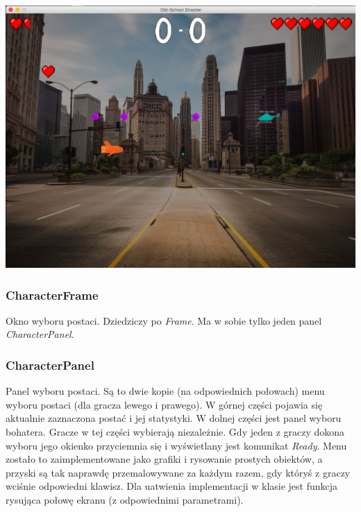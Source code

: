 \documentclass[a4paper,10pt]{article}
\begin{document}
\begin{center}
\includegraphics[scale=0.18]{pojedynek.png}
\end{center}

\subsubsection{CharacterFrame}

Okno wyboru postaci. Dziedziczy po \textit{Frame}. Ma w sobie tylko jeden panel \textit{CharacterPanel}.

\subsubsection{CharacterPanel}

Panel wyboru postaci. Są to dwie kopie (na odpowiednich połowach) menu wyboru postaci (dla gracza lewego i prawego). W górnej części pojawia się aktualnie zaznaczona postać i jej statystyki. W dolnej części jest panel wyboru bohatera. Gracze w tej części wybierają niezależnie. Gdy jeden z graczy dokona wyboru jego okienko przyciemnia się i wyświetlany jest komunikat \textit{Ready}. Menu zostało to zaimplementowane jako grafiki i rysowanie prostych obiektów, a przyski są tak naprawdę przemalowywane za każdym razem, gdy któryś z graczy wciśnie odpowiedni klawisz. Dla uatwienia implementacji w klasie jest funkcja rysująca połowę ekranu (z odpowiednimi parametrami).
\end{document}

